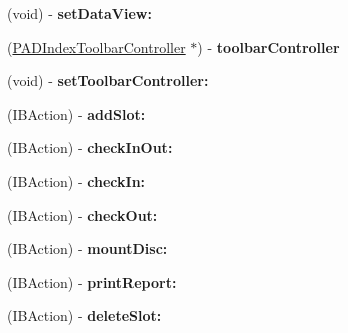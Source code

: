 \begin{DoxyCompactItemize}
\item 
\hypertarget{interface_app_controller_a42024dc6e0779f85e08d5afabe219608}{
(void) -\/ {\bfseries setDataView:}}
\label{interface_app_controller_a42024dc6e0779f85e08d5afabe219608}

\item 
\hypertarget{interface_app_controller_ac6339247c8914894a9d180cfcf0d0757}{
(\hyperlink{interface_p_a_d_index_toolbar_controller}{PADIndexToolbarController} $\ast$) -\/ {\bfseries toolbarController}}
\label{interface_app_controller_ac6339247c8914894a9d180cfcf0d0757}

\item 
\hypertarget{interface_app_controller_a2d48591d49b8f9e40f76b037ba166a83}{
(void) -\/ {\bfseries setToolbarController:}}
\label{interface_app_controller_a2d48591d49b8f9e40f76b037ba166a83}

\item 
\hypertarget{interface_app_controller_a14ef33305b00848aea588563ca435c61}{
(IBAction) -\/ {\bfseries addSlot:}}
\label{interface_app_controller_a14ef33305b00848aea588563ca435c61}

\item 
\hypertarget{interface_app_controller_afc781f8c4bb5830c0133aeb847fbd67b}{
(IBAction) -\/ {\bfseries checkInOut:}}
\label{interface_app_controller_afc781f8c4bb5830c0133aeb847fbd67b}

\item 
\hypertarget{interface_app_controller_a0724329d694fa5828a736e097e7ec214}{
(IBAction) -\/ {\bfseries checkIn:}}
\label{interface_app_controller_a0724329d694fa5828a736e097e7ec214}

\item 
\hypertarget{interface_app_controller_a19b939e100cab1a00b776e2c2fa7f557}{
(IBAction) -\/ {\bfseries checkOut:}}
\label{interface_app_controller_a19b939e100cab1a00b776e2c2fa7f557}

\item 
\hypertarget{interface_app_controller_a58b629896a2a74ec9994942632f47404}{
(IBAction) -\/ {\bfseries mountDisc:}}
\label{interface_app_controller_a58b629896a2a74ec9994942632f47404}

\item 
\hypertarget{interface_app_controller_a8792d254cdcf6b59511532929d53f9b3}{
(IBAction) -\/ {\bfseries printReport:}}
\label{interface_app_controller_a8792d254cdcf6b59511532929d53f9b3}

\item 
\hypertarget{interface_app_controller_a70e96c79c28becb6cb632bd2ef9b3234}{
(IBAction) -\/ {\bfseries deleteSlot:}}
\label{interface_app_controller_a70e96c79c28becb6cb632bd2ef9b3234}


\end{DoxyCompactItemize}
